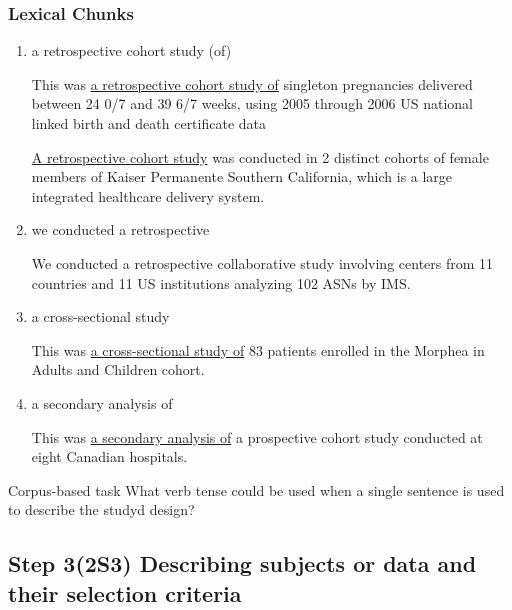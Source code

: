 \documentclass{ctexbook}
\begin{document}
    \subsubsection{Lexical Chunks}

    \begin{enumerate}
      \item a retrospective cohort study (of)
      \begin{eg}{}
        This was \uline{a retrospective cohort study of} singleton pregnancies delivered between 24 0/7 and 39 6/7 weeks, using 2005 through 2006 US national linked birth and death certificate data
      \end{eg}
      
      \begin{eg}{}
        \uline{A retrospective cohort study} was conducted in 2 distinct cohorts of female members of Kaiser Permanente Southern California, which is a large integrated healthcare delivery system.
      \end{eg}

      \item we conducted a retrospective
      \begin{eg}{}
        We conducted a retrospective collaborative study involving centers from 11 countries and 11 US institutions analyzing 102 ASNs by IMS.
      \end{eg}

      \item a cross-sectional study
      \begin{eg}{}
        This was \uline{a cross-sectional study of} 83 patients enrolled in the Morphea in Adults and Children cohort.
      \end{eg}

      \item a secondary analysis of
      \begin{eg}{}
        This was \uline{a secondary analysis of} a prospective cohort study conducted at eight Canadian hospitals.
      \end{eg}
    \end{enumerate}

    \begin{task}{\heiti Corpus-based task}
      What verb tense could be used when a single sentence is used to describe the studyd design?
    \end{task}

  \subsection{Step 3(2S3) Describing subjects or data and their selection criteria}
\end{document}
